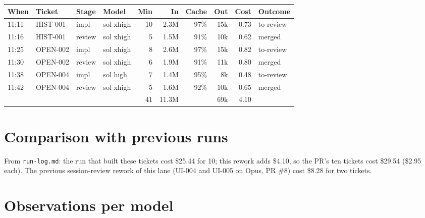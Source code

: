 \documentclass[11pt,a4paper]{article}
\begin{document}
{\small
\begin{tabularx}{\linewidth}{@{}llllrrrrrX@{}}
\toprule
When & Ticket & Stage & Model & Min & In & Cache & Out & Cost & Outcome \\
\midrule
11:11 & HIST-001 & impl & sol xhigh & 10 & 2.3M & 97\% & 15k & 0.73 & to-review \\
11:16 & HIST-001 & review & sol xhigh & 5 & 1.5M & 91\% & 10k & 0.62 & merged \\
11:25 & OPEN-002 & impl & sol xhigh & 8 & 2.6M & 97\% & 15k & 0.82 & to-review \\
11:30 & OPEN-002 & review & sol xhigh & 6 & 1.9M & 91\% & 11k & 0.80 & merged \\
11:38 & OPEN-004 & impl & sol high & 7 & 1.4M & 95\% & 8k & 0.48 & to-review \\
11:42 & OPEN-004 & review & sol xhigh & 5 & 1.6M & 92\% & 10k & 0.65 & merged \\
\midrule
 & & & & 41 & 11.3M & & 69k & 4.10 & \\
\bottomrule
\end{tabularx}
}

\begin{center}
\end{center}

\section*{Comparison with previous runs}

From \texttt{run-log.md}: the run that built these tickets cost \$25.44 for 10; this rework adds
\$4.10, so the PR's ten tickets cost \$29.54 (\$2.95 each). The previous session-review rework
of this lane (UI-004 and UI-005 on Opus, PR \#8) cost \$8.28 for two tickets.

\section*{Observations per model}
\end{document}
